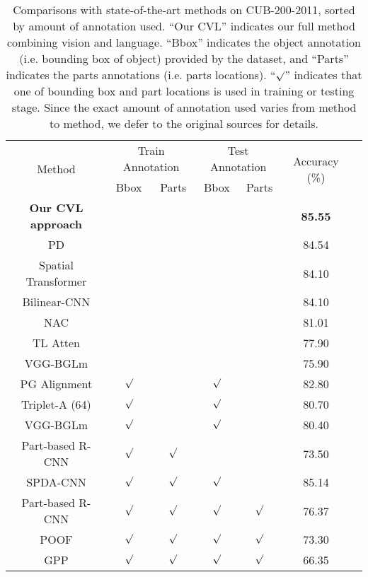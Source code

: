 \documentclass[10pt,twocolumn,letterpaper]{article}
\begin{document}
\begin{table*}[!ht]
   \centering
   \begin{tabular} {|c|c|c|c|c|c|c|}
      \hline
      \multirow {2}{*}{Method} & \multicolumn{2}{|c|}{Train Annotation} & \multicolumn{2}{|c|}{Test Annotation} & \multirow {2}{*}{Accuracy (\%)} \\ 
      \cline{2-5}
      &Bbox & Parts & Bbox & Parts &\\
      \hline
      \hline
      \textbf{Our CVL approach} & & & & & {\textbf{85.55}} \\
      \hline
      PD \cite{picking} & & & & & 84.54 \\
      Spatial Transformer \cite{jaderberg2015spatial} & & & & & 84.10 \\
      Bilinear-CNN \cite{lin2015bilinear} & & & & & 84.10 \\
      NAC \cite{simon2015neural} & & & & & 81.01  \\
      TL Atten \cite{twoattention} & & & & & 77.90  \\
      VGG-BGLm \cite{zhou2015fine} & & & & & 75.90  \\
      \hline
      PG Alignment \cite{krause2015fine} & $\surd$ & & $\surd$ & & 82.80 \\
      Triplet-A (64) \cite{cui2015fine} & $\surd$ & & $\surd$ & & 80.70\\
      VGG-BGLm \cite{zhou2015fine} & $\surd$ & & $\surd$ & & 80.40 \\
      Part-based R-CNN \cite{partrcnn} & $\surd$ & $\surd$ &  & & 73.50 \\
      \hline
      SPDA-CNN \cite{zhangspda} & $\surd$ & $\surd$ &$\surd$ &  & 85.14\\
      Part-based R-CNN \cite{partrcnn}& $\surd$ & $\surd$ & $\surd$ & $\surd$ & 76.37 \\
      POOF \cite{berg2013poof} & $\surd$ & $\surd$ & $\surd$ & $\surd$ & 73.30  \\
      GPP \cite{xie2013hierarchical} & $\surd$ & $\surd$ & $\surd$ & $\surd$ & 66.35  \\
      \hline
   \end{tabular}
   \caption{Comparisons with state-of-the-art methods on CUB-200-2011, sorted by amount of annotation used. ``Our CVL'' indicates our full method combining vision and language. ``Bbox'' indicates the object annotation (i.e. bounding box of object) provided by the dataset, and ``Parts'' indicates the parts annotations (i.e. parts locations). ``$\surd$'' indicates that one of bounding box and part locations is used in training or testing stage. Since the exact amount of annotation used varies from method to method, we defer to the original sources for details.}
   \label{cubresult}
\end{table*}
\end{document}
